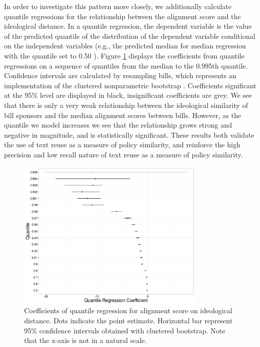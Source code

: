 \documentclass[12pt]{article} %
\begin{document}
In order to investigate this pattern more closely, we additionally calculate
quantile regressions for the relationship between the alignment score and the
ideological distance. In a quantile regression, the dependent variable is the value of the predicted quantile of the distribution of the dependent variable conditional on the independent variables (e.g., the predicted median for median regression with the quantile set to 0.50 \citep{harden2011linear}). Figure \ref{fig:quantile_regression} displays the
coefficients from quantile regressions on a sequence of quantiles from the
median to the 0.995th quantile. Confidence intervals are calculated by
resampling bills, which represents an implementation of the clustered
nonparametric bootstrap \citep{harden2011bootstrap}. Coefficients significant at the 95\% level are displayed in black, insignificant coefficients are grey. We see that there is only a very weak relationship between the ideological similarity of bill sponsors and the median alignment scores between bills. However, as the quantile we model increases we see that the relationship grows strong and negative in magnitude, and is statistically significant. These results both validate the use of text reuse as a measure of policy similarity, and reinforce the high precision and low recall nature of text reuse as a measure of policy similarity.




\begin{figure}[ht!]
    \centering
    \includegraphics[width=0.8\textwidth]{figures/quantile_regression.png}
    \caption{Coefficients of quantile regression for alignment score on
    ideological distance. Dots indicate the point estimate. Horizontal bar
represent 95\% confidence intervals obtained with clustered bootstrap. 
Note that the x-axis is not in a natural scale.}
    \label{fig:quantile_regression}
\end{figure}
\end{document}
